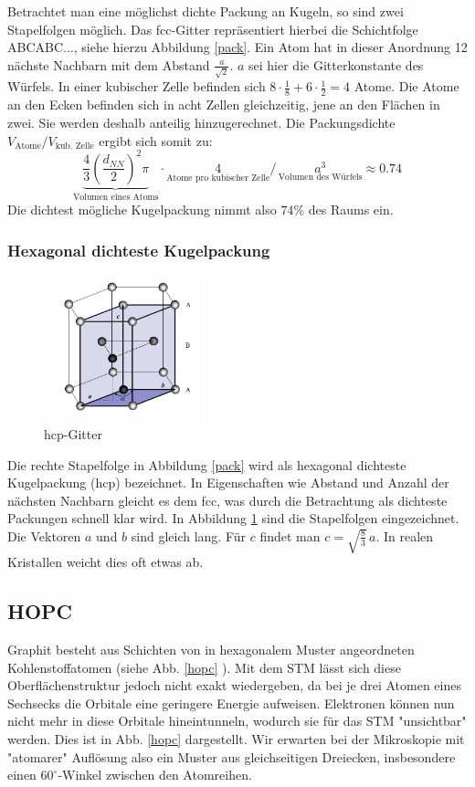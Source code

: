 Betrachtet man eine möglichst dichte Packung an Kugeln, so sind zwei Stapelfolgen 
möglich. Das fcc-Gitter repräsentiert hierbei die Schichtfolge ABCABC..., siehe 
hierzu Abbildung \ref{pack}. Ein Atom hat in dieser Anordnung 12 nächste Nachbarn
mit dem Abstand $\frac{a}{\sqrt{2}}$. $a$ sei hier die Gitterkonstante des Würfels.
In einer kubischer Zelle befinden sich $8 \cdot \frac{1}{8} + 6 \cdot \frac{1}{2} 
= 4$ Atome. Die Atome an den Ecken befinden sich in acht Zellen gleichzeitig, jene 
an den Flächen in zwei. Sie werden deshalb anteilig hinzugerechnet.
Die Packungsdichte $ V_{\text{Atome}} / V_{\text{kub. Zelle}} $ ergibt sich somit zu:
\[
\underset{\text{Volumen eines Atoms}}{
	\underbrace{
		\frac{4}{3} \left( \frac{d_{NN}}{2} \right)^2 \pi}} \cdot
\underset{\text{Atome pro kubischer Zelle}}{4} 
/ \, 
\underset{\text{Volumen des Würfels}}{a^3} \approx 0.74
\]
Die dichtest mögliche Kugelpackung nimmt also $74\%$ des Raums ein.

\subsubsection{Hexagonal dichteste Kugelpackung}

\begin{figure}
	\centering
	\includegraphics[width=0.4\textwidth]{Abb/hcp.png}
	\caption{hcp-Gitter \cite{hunklinger}}
	\label{hcp}
\end{figure}
Die rechte Stapelfolge in Abbildung \ref{pack} wird als hexagonal dichteste
Kugelpackung (hcp) bezeichnet. In Eigenschaften wie Abstand und Anzahl der nächsten
Nachbarn gleicht es dem fcc, was durch die Betrachtung als dichteste Packungen 
schnell klar wird. In Abbildung \ref{hcp} sind die Stapelfolgen eingezeichnet.
Die Vektoren $a$ und $b$ sind gleich lang. Für $c$ findet man $c = \sqrt{ 
	\frac{8}{3}} \, a$. In realen Kristallen weicht dies oft etwas ab.\par
\cite{hunklinger}

\subsection{HOPC}
Graphit besteht aus Schichten von in hexagonalem Muster angeordneten Kohlenstoffatomen (siehe Abb. \ref{hopc} ). Mit dem STM lässt sich diese Oberflächenstruktur jedoch nicht exakt wiedergeben, da bei je drei Atomen eines Sechsecks die Orbitale eine geringere Energie aufweisen. Elektronen können nun nicht mehr in diese Orbitale hineintunneln, wodurch sie für das STM "{}unsichtbar"{} werden. Dies ist in Abb. \ref{hopc}  dargestellt. Wir erwarten bei der Mikroskopie mit "{}atomarer"{} Auflösung also ein Muster aus gleichseitigen Dreiecken, insbesondere einen $60^\circ$-Winkel zwischen den Atomreihen.

